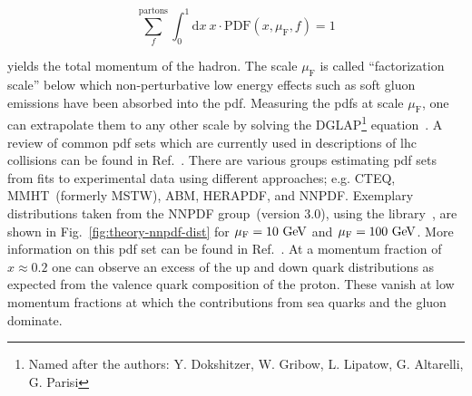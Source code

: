 \begin{equation}
\sum_{f}^\mathrm{partons}\int_{0}^{1}\mathrm{d}x~x\cdot \mathrm{PDF}(x,\mu_\mathrm{F},f)=1
\end{equation}

yields the total momentum of the hadron. The scale $\mu_\mathrm{F}$ is called ``factorization scale'' below which non-perturbative low energy effects such as soft gluon emissions have been absorbed into the \gls{pdf}. Measuring the \glspl{pdf} at scale $\mu_\mathrm{F}$, one can extrapolate them to any other scale by solving the DGLAP\footnote{Named after the authors: Y. Dokshitzer, W. Gribow, L. Lipatow, G. Altarelli, G. Parisi} equation~\cite{Dokshitzer:1977sg,Gribov:1972ri,Altarelli:1977zs}. A review of common \gls{pdf} sets which are currently used in descriptions of \gls{lhc} collisions can be found in Ref.~\cite{Accardi2016}. There are various groups estimating \gls{pdf} sets from fits to experimental data using different approaches; e.g. CTEQ, MMHT~(formerly MSTW), ABM, HERAPDF, and NNPDF. Exemplary distributions taken from the NNPDF group~(version 3.0), using the \LHAPDF[format=hyperbf] library~\cite{Buckley:2014ana}, are shown in Fig.~\ref{fig:theory-nnpdf-dist} for $\mu_\mathrm{F}=10~\textrm{GeV}$ and $\mu_\mathrm{F}=100~\textrm{GeV}$. More information on this \gls{pdf} set can be found in Ref.~\cite{Ball:2014uwa}. At a momentum fraction of $x\approx0.2$ one can observe an excess of the up and down quark distributions as expected from the valence quark composition of the proton. These vanish at low momentum fractions at which the contributions from sea quarks and the gluon dominate.


